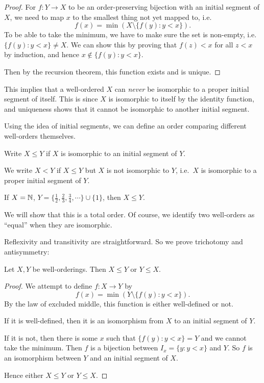 \documentclass[a4paper]{article}
\begin{document}
\begin{proof}
  For $f: Y\to X$ to be an order-preserving bijection with an initial segment of $X$, we need to map $x$ to the smallest thing not yet mapped to, i.e.
  \[
    f(x) = \min (X\setminus \{f(y): y < x\}).
  \]
  To be able to take the minimum, we have to make sure the set is non-empty, i.e.\ $\{f(y): y < x\} \not= X$. We can show this by proving that $f(z) < x$ for all $z < x$ by induction, and hence $x \not\in \{f(y): y < x\}$.

  Then by the recursion theorem, this function exists and is unique.
\end{proof}
This implies that a well-ordered $X$ can \emph{never} be isomorphic to a proper initial segment of itself. This is since $X$ is isomorphic to itself by the identity function, and uniqueness shows that it cannot be isomorphic to another initial segment.

Using the idea of initial segments, we can define an order comparing different well-orders themselves.
\begin{notation}
  Write $X\leq Y$ if $X$ is isomorphic to an initial segment of $Y$.

  We write $X < Y$ if $X\leq Y$ but $X$ is not isomorphic to $Y$, i.e.\ $X$ is isomorphic to a proper initial segment of $Y$.
\end{notation}

\begin{eg}
  If $X = \mathbb{N}$, $Y = \{\frac{1}{2}, \frac{2}{3}, \frac{3}{4},\cdots\}\cup \{1\}$, then $X \leq Y$.
\end{eg}

We will show that this is a total order. Of course, we identify two well-orders as ``equal'' when they are isomorphic.

Reflexivity and transitivity are straightforward. So we prove trichotomy and antisymmetry:
\begin{thm}
  Let $X, Y$ be well-orderings. Then $X\leq Y$ or $Y \leq X$.
\end{thm}

\begin{proof}
  We attempt to define $f: X\to Y$ by
  \[
    f(x) = \min (Y\setminus \{f(y): y < x\}).
  \]
  By the law of excluded middle, this function is either well-defined or not.

  If it is well-defined, then it is an isomorphism from $X$ to an initial segment of $Y$.

  If it is not, then there is some $x$ such that $\{f(y): y < x\} = Y$ and we cannot take the minimum. Then $f$ is a bijection between $I_x = \{y: y < x\}$ and $Y$. So $f$ is an isomorphism between $Y$ and an initial segment of $X$.

  Hence either $X \leq Y$ or $Y \leq X$.
\end{proof}
\end{document}
